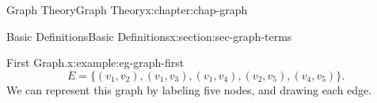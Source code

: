 \documentclass[oneside,10pt,]{book}
\numberwithin{equation}{section}
\begin{document}
\begin{chapterptx}{Graph Theory}{}{Graph Theory}{}{}{x:chapter:chap-graph}
\begin{sectionptx}{Basic Definitions}{}{Basic Definitions}{}{}{x:section:sec-graph-terms}
\begin{example}{First Graph.}{x:example:eg-graph-first}
\begin{equation*}
E = \{(v_1,v_2),(v_1,v_3),(v_1,v_4),(v_2,v_5),(v_4,v_5)\}\text{.}
\end{equation*}
We can represent this graph by labeling five nodes, and drawing each edge.%
\begin{sidebyside}{1}{0.375}{0.375}{0}%
\begin{sbspanel}{0.25}%
\end{sbspanel}
\end{sidebyside}
\end{example}
\end{sectionptx}
\end{chapterptx}
\end{document}
